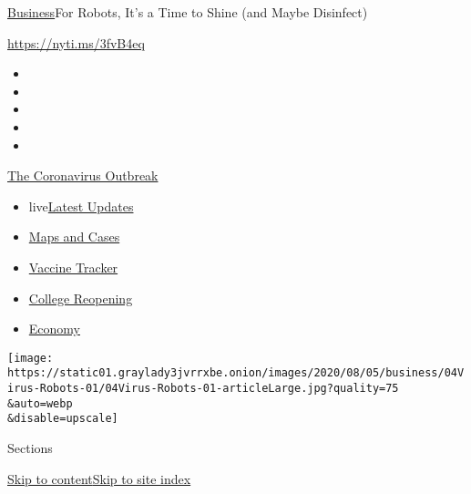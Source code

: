 \href{/section/business}{Business}\textbar{}For Robots, It's a Time to
Shine (and Maybe Disinfect)

\url{https://nyti.ms/3fvB4eq}

\begin{itemize}
\item
\item
\item
\item
\item
\end{itemize}

\href{https://www.nytimes3xbfgragh.onion/news-event/coronavirus?action=click\&pgtype=Article\&state=default\&region=TOP_BANNER\&context=storylines_menu}{The
Coronavirus Outbreak}

\begin{itemize}
\tightlist
\item
  live\href{https://www.nytimes3xbfgragh.onion/2020/08/04/world/coronavirus-cases.html?action=click\&pgtype=Article\&state=default\&region=TOP_BANNER\&context=storylines_menu}{Latest
  Updates}
\item
  \href{https://www.nytimes3xbfgragh.onion/interactive/2020/us/coronavirus-us-cases.html?action=click\&pgtype=Article\&state=default\&region=TOP_BANNER\&context=storylines_menu}{Maps
  and Cases}
\item
  \href{https://www.nytimes3xbfgragh.onion/interactive/2020/science/coronavirus-vaccine-tracker.html?action=click\&pgtype=Article\&state=default\&region=TOP_BANNER\&context=storylines_menu}{Vaccine
  Tracker}
\item
  \href{https://www.nytimes3xbfgragh.onion/2020/08/02/us/covid-college-reopening.html?action=click\&pgtype=Article\&state=default\&region=TOP_BANNER\&context=storylines_menu}{College
  Reopening}
\item
  \href{https://www.nytimes3xbfgragh.onion/live/2020/08/04/business/stock-market-today-coronavirus?action=click\&pgtype=Article\&state=default\&region=TOP_BANNER\&context=storylines_menu}{Economy}
\end{itemize}

\texttt{[image: https://static01.graylady3jvrrxbe.onion/images/2020/08/05/business/04Virus-Robots-01/04Virus-Robots-01-articleLarge.jpg?quality=75\\\&auto=webp\\\&disable=upscale]}

Sections

\protect\hyperlink{site-content}{Skip to
content}\protect\hyperlink{site-index}{Skip to site index}

